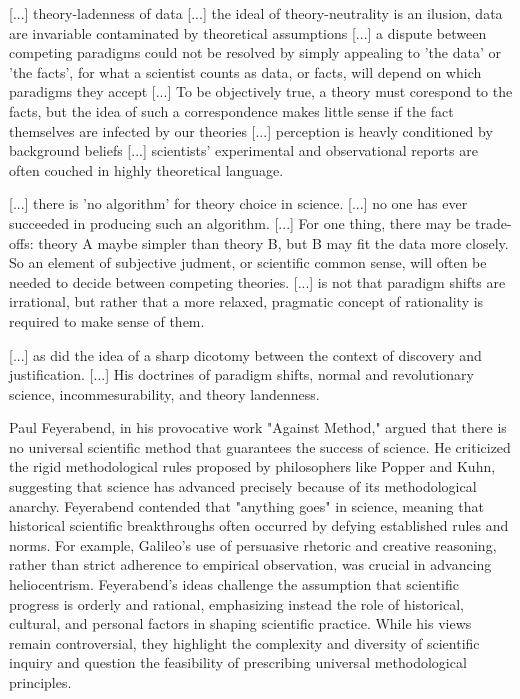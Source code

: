 {[...] theory-ladenness of data [...] the ideal of theory-neutrality is an ilusion, data are invariable contaminated by theoretical assumptions [...] a dispute between competing paradigms could not be resolved by simply appealing to 'the data' or 'the facts', for what a scientist counts as data, or facts, will depend on which paradigms they accept [...] To be objectively true, a theory must corespond to the facts, but the idea of such a correspondence makes little sense if the fact themselves are infected by our theories [...] perception is heavly conditioned by background beliefs [...] scientists' experimental and observational reports are often couched in highly theoretical language.

[...] there is 'no algorithm' for theory choice in science. [...] no one has ever succeeded in producing such an algorithm. [...] For one thing, there may be trade-offs: theory A maybe simpler than theory B, but B may fit the data more closely. So an element of subjective judment, or scientific common sense, will often be needed to decide between competing theories. [...] is not that paradigm shifts are irrational, but rather that a more relaxed, pragmatic concept of rationality is required to make sense of them.

[...] as did the idea of a sharp dicotomy between the context of discovery and justification. [...] His doctrines of paradigm shifts, normal and revolutionary science, incommesurability, and theory landenness.

}

Paul Feyerabend, in his provocative work "Against Method," argued that there is no universal scientific method that guarantees the success of science. He criticized the rigid methodological rules proposed by philosophers like Popper and Kuhn, suggesting that science has advanced precisely because of its methodological anarchy. Feyerabend contended that "anything goes" in science, meaning that historical scientific breakthroughs often occurred by defying established rules and norms. For example, Galileo's use of persuasive rhetoric and creative reasoning, rather than strict adherence to empirical observation, was crucial in advancing heliocentrism. Feyerabend's ideas challenge the assumption that scientific progress is orderly and rational, emphasizing instead the role of historical, cultural, and personal factors in shaping scientific practice. While his views remain controversial, they highlight the complexity and diversity of scientific inquiry and question the feasibility of prescribing universal methodological principles.

